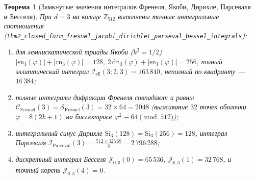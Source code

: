 \documentclass[11pt,a4paper]{article}
\theoremstyle{plain}
\newtheorem{theorem}{Теорема}[section]
\theoremstyle{definition}
\begin{document}
\begin{theorem}[Замкнутые значения интегралов Френеля, Якоби, Дирихле, Парсеваля и Бесселя]
\label{thm:main-2}
При $d=3$ на кольце $\mathbb{Z}_{512}$ выполнены точные интегральные соотношения (\texttt{thm2\_closed\_form\_fresnel\_jacobi\_dirichlet\_parseval\_bessel\_integrals}):
\begin{enumerate}[label=\textbf{(\roman*)},leftmargin=*]
\item для лемнискатической триады Якоби ($k^2 = 1/2$) $|\mathrm{sn}_3(\varphi)|+|\mathrm{cn}_3(\varphi)|=128$, $2\,\mathrm{dn}_3(\varphi)+|\mathrm{sn}_3(\varphi)|=256$, полный эллиптический интеграл $\mathcal{I}_{\mathrm{ell}}(3;2,3) = 163\,840$, неполный по квадранту --- $16\,384$;
\item полные интегралы дифракции Френеля совпадают и равны $\mathcal{C}_{\mathrm{Fresnel}}(3) = \mathcal{S}_{\mathrm{Fresnel}}(3) = 32\times 64 = 2048$ (выживание $32$ точек оболочки $\varphi = 8(2k+1)$ на биссектрисе $\varphi^2\equiv 64\pmod{512}$);
\item интегральный синус Дирихле $\mathrm{Si}_3(128) = \mathrm{Si}_3(256) = 128$, интеграл Парсеваля $\mathcal{I}_{\mathrm{Parseval}}(3) = \frac{512\times 32\,769}{6} = 2\,796\,288$;
\item дискретный интеграл Бесселя $\mathcal{J}_{0,3}(0) = 65\,536$, $\mathcal{J}_{0,3}(1) = 32\,768$, и точный корень $\mathcal{J}_{0,3}(4) = 0$.
\end{enumerate}
\end{theorem}
\end{document}
